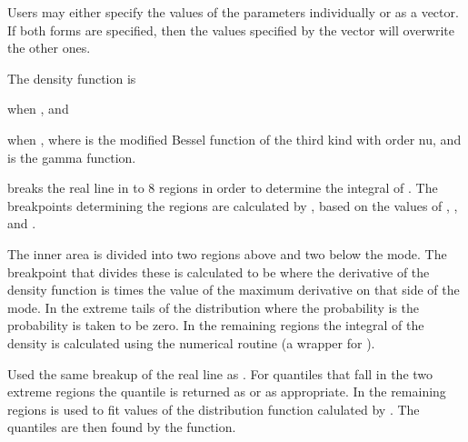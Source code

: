 \documentclass{book}
\begin{document}
\begin{Details}\relax
Users may either specify the values of the parameters individually or
as a vector. If both forms are specified, then the values specified by
the vector  will overwrite the other ones.

The density function is


when , and


when ,
where  is the modified Bessel function of the third
kind with order nu, and  is the gamma function.

 breaks the real line in to 8 regions in order to
determine the integral of . The breakpoints determining
the regions are calculated by , based on the
values of , , and .

The inner area is divided into two regions above and two below the
mode. The breakpoint that divides these is calculated to be where the
derivative of the density function is  times the value of
the maximum derivative on that side of the mode. In the extreme tails
of the distribution where the probability is  the
probability is taken to be zero. In the remaining regions the integral
of the density is calculated using the numerical routine
 (a wrapper for
).

 Used the same breakup of the real line as
. For quantiles that fall in the two extreme regions
the quantile is returned as  or  as
appropriate. In the remaining regions  is used to fit
values of the distribution function calulated by . The
quantiles are then found by the  function.
\end{Details}
\end{document}
